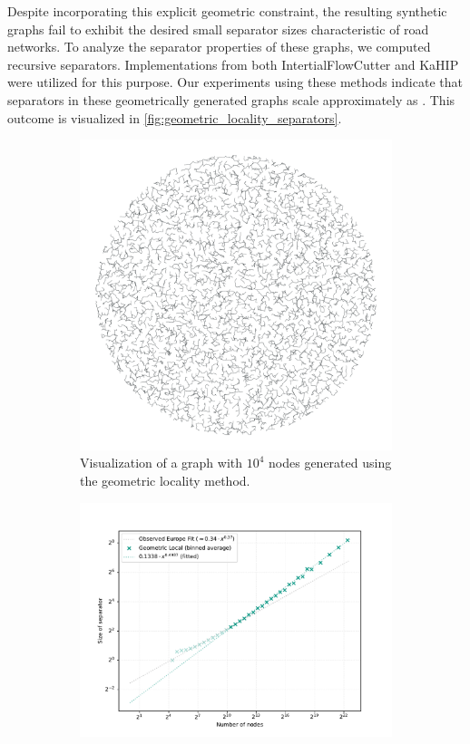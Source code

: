 Despite incorporating this explicit geometric constraint, the resulting synthetic graphs fail to exhibit the desired small separator sizes characteristic of road networks.
To analyze the separator properties of these graphs, we computed recursive separators.
Implementations from both IntertialFlowCutter and KaHIP were utilized for this purpose.
Our experiments using these methods indicate that separators in these geometrically generated graphs scale approximately as .
This outcome is visualized in \cref{fig:geometric_locality_separators}.

\begin{figure}[tbhp]
	\begin{subfigure}{0.35\linewidth}
		\centering
		\includegraphics[width=\linewidth]{graphics/local_embedding.png}
        \caption{Visualization of a graph with \(10^4\) nodes generated using the geometric locality method.}
		\label{fig:geometric_locality_graph_viz}
	\end{subfigure}
	\hfill
	\begin{subfigure}{0.55\linewidth}
		\centering
		\includegraphics[width=\linewidth]{graphics/sep_local_embedding.pdf}

\end{subfigure}
\end{figure}
